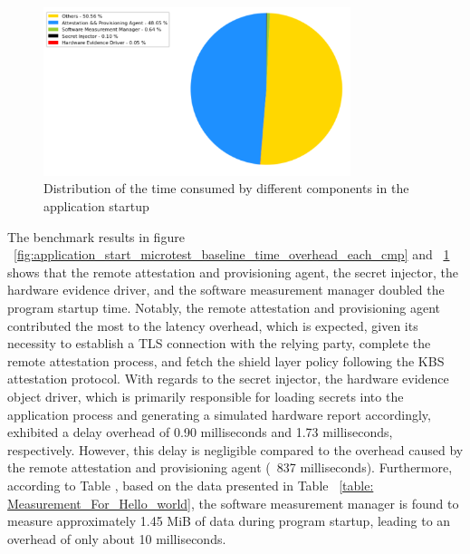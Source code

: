\begin{figure}[H]
    \centering
    \includegraphics[width=0.8\textwidth]{images/application_start_microtest_baseline_time_distribution.PNG}
    \caption[Time  Distribution of the application startup ]{Distribution of the time consumed by different components in the application startup}
    \label{fig:application_start_microtest_baseline_time_distribution}
\end{figure}



The benchmark results in figure ~\ref{fig:application_start_microtest_baseline_time_overhead_each_cmp} and ~\ref{fig:application_start_microtest_baseline_time_distribution}  shows that the remote attestation and provisioning agent, the secret injector, the hardware evidence driver, and the software measurement manager doubled the program startup time. Notably, the remote attestation and provisioning agent contributed the most to the latency 
overhead, which is expected, given its necessity to establish a TLS connection with the relying party, complete the remote attestation process, and fetch the shield layer policy following the KBS attestation protocol. With regards to the secret injector, the hardware evidence object driver, 
which is primarily responsible for loading secrets into the application process and generating a simulated hardware report accordingly,  exhibited a delay overhead of 0.90 milliseconds and 1.73 milliseconds, respectively. However, this delay is negligible compared to the overhead caused 
by the remote attestation and provisioning agent (~837 milliseconds).  Furthermore, according to Table , based on the data presented in Table ~\ref{table: Measurement_For_Hello_world}, the software measurement manager is found to measure approximately 1.45 MiB of data during program startup, leading to an overhead of only about 
10 milliseconds.

